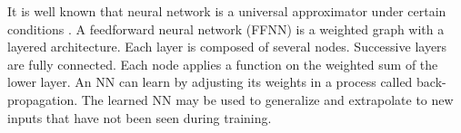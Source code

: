 \documentclass[11pt,a4paper]{article}
\begin{document}
It is well known that  neural network is a universal approximator under certain conditions \cite{hornik1991approximation}.
A feedforward neural network (FFNN) is a weighted graph with a layered architecture.
Each layer is composed of several nodes.
Successive layers are fully connected. Each node applies a function on the weighted sum of the lower layer.
An NN can learn by adjusting its weights in a process called back-propagation. 
The learned NN may be used to generalize and extrapolate to new inputs that have not been seen during training.
\end{document}
